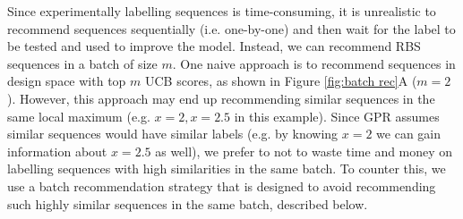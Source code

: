 Since experimentally labelling sequences is time-consuming, it is unrealistic to recommend sequences sequentially (i.e. one-by-one) and then wait for the label to be tested and used to improve the model.
Instead, we can recommend RBS sequences in a batch of size $m$.
One naive approach is to
recommend sequences in design space with top $m$ UCB scores, as shown in Figure \ref{fig:batch rec}A ($m = 2$).
However, this approach may end up recommending similar sequences in the same local maximum (e.g. $x = 2, x =2.5$ in this example).
Since GPR assumes similar sequences would have similar labels (e.g. by knowing $x=2$ we can gain information about $x=2.5$ as well), we prefer to not to waste time and money on labelling sequences with high similarities in the same batch.
To counter this, we use a batch recommendation strategy that is designed to avoid recommending such highly similar sequences in the same batch, described below. \\


